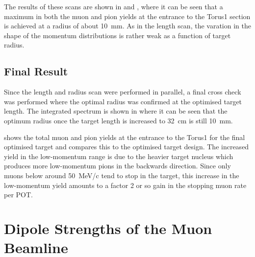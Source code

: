 The results of these scans are shown in  and ,
where it can be seen that a maximum in both the muon and pion yields at the entrance to the Torus1 section is achieved at a radius of about 10~mm.
As in the length scan, the varation in the shape of the momentum distributions is rather weak as a function of target radius.

\subsection{Final Result}
\FigOptimProdTgtFinal
\FigOptimProdTgtComparePhases
Since the length and radius scan were performed in parallel, a final cross check was performed where the optimal radius was confirmed at the optimised target length.
The integrated spectrum is shown in  where it can be seen that the optimum radius once the target length is increased to 32~cm is still 10~mm.

 shows the total muon and pion yields at the entrance to the Torus1 for the final optimised \phaseII target and compares this to the optimised \phaseI target design.
The increased yield in the low-momentum range is due to the heavier target nucleus which produces more low-momentum pions in the backwards direction.
Since only muons below around 50~MeV/c tend to stop in the target, this increase in the low-momentum yield amounts to a factor 2 or so gain in the stopping muon rate per POT.

\section{Dipole Strengths of the Muon Beamline}

